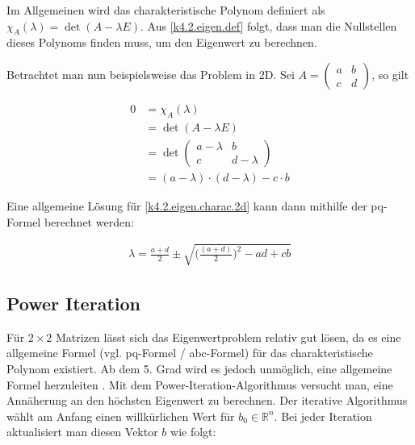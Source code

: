 \documentclass[]{dsadokumentation}
\begin{document}
Im Allgemeinen wird das charakteristische Polynom definiert als $\chi_A (\lambda) = \det(A - \lambda E)$. Aus \cref{k4.2.eigen.def} folgt, dass man die Nullstellen dieses Polynoms finden muss, um den Eigenwert zu berechnen.

Betrachtet man nun beispielsweise das Problem in 2D. Sei $A = \begin{pmatrix}
  a & b \\
  c & d
\end{pmatrix}$, so gilt

\begin{equation}
  \label{k4.2.eigen.charac.2d}
  \begin{aligned}
    0
    &= \chi_A (\lambda) \\
    &= \det(A - \lambda E) \\
    &= \det \begin{pmatrix}
      a - \lambda & b \\
      c & d-\lambda
    \end{pmatrix} \\
    &= (a - \lambda) \cdot (d - \lambda) - c \cdot b
  \end{aligned}
\end{equation}

Eine allgemeine Lösung für \cref{k4.2.eigen.charac.2d} kann dann mithilfe der pq-Formel berechnet werden:

\begin{equation}
  \begin{aligned}
    \lambda = \frac{a+d}{2} \pm \sqrt{\Big(\frac{(a+d)}{2}\Big)^2-ad+cb}
  \end{aligned}
\end{equation}


\subsection{Power Iteration}\label{k4.2.eigen.powerit}

Für $2 \times 2$ Matrizen lässt sich das Eigenwertproblem relativ gut lösen, da es eine allgemeine Formel (vgl. pq-Formel / abc-Formel) für das charakteristische Polynom existiert. Ab dem 5. Grad wird es jedoch unmöglich, eine allgemeine Formel herzuleiten \parencite{k4.2.ramond}. %
Mit dem Power-Iteration-Algorithmus versucht man, eine Annäherung an den höchsten Eigenwert zu berechnen. Der iterative Algorithmus wählt am Anfang einen willkürlichen Wert für $b_0 \in \mathbb{R}^n$. Bei jeder Iteration aktualisiert man diesen Vektor $b$ wie folgt:
\end{document}
